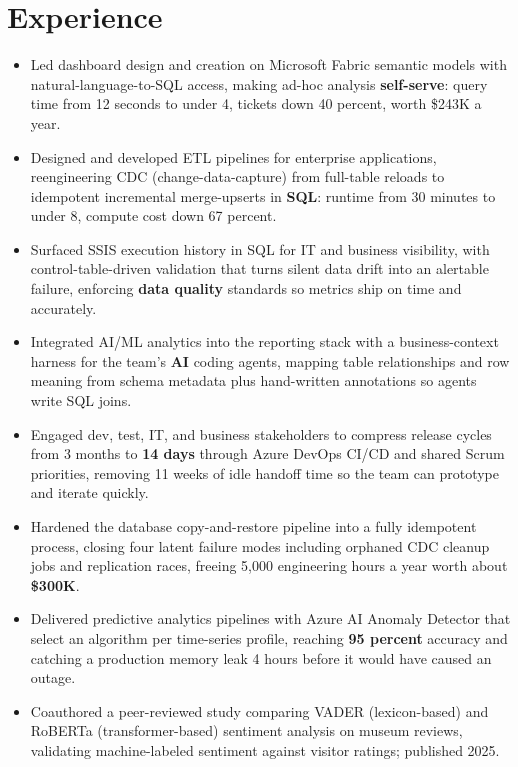 \documentclass[letterpaper,10pt]{article}
\begin{document}
\section{Experience}
\begin{itemize}
\item Led dashboard design and creation on Microsoft Fabric semantic models with natural-language-to-SQL access, making ad-hoc analysis \textbf{self-serve}: query time from 12 seconds to under 4, tickets down 40 percent, worth \$243K a year.
\item Designed and developed ETL pipelines for enterprise applications, reengineering CDC (change-data-capture) from full-table reloads to idempotent incremental merge-upserts in \textbf{SQL}: runtime from 30 minutes to under 8, compute cost down 67 percent.
\item Surfaced SSIS execution history in SQL for IT and business visibility, with control-table-driven validation that turns silent data drift into an alertable failure, enforcing \textbf{data quality} standards so metrics ship on time and accurately.
\item Integrated AI/ML analytics into the reporting stack with a business-context harness for the team's \textbf{AI} coding agents, mapping table relationships and row meaning from schema metadata plus hand-written annotations so agents write SQL joins.
\item Engaged dev, test, IT, and business stakeholders to compress release cycles from 3 months to \textbf{14 days} through Azure DevOps CI/CD and shared Scrum priorities, removing 11 weeks of idle handoff time so the team can prototype and iterate quickly.
\item Hardened the database copy-and-restore pipeline into a fully idempotent process, closing four latent failure modes including orphaned CDC cleanup jobs and replication races, freeing 5,000 engineering hours a year worth about \textbf{\$300K}.
\end{itemize}

\begin{itemize}
\item Delivered predictive analytics pipelines with Azure AI Anomaly Detector that select an algorithm per time-series profile, reaching \textbf{95 percent} accuracy and catching a production memory leak 4 hours before it would have caused an outage.
\item Coauthored a peer-reviewed study comparing VADER (lexicon-based) and RoBERTa (transformer-based) sentiment analysis on museum reviews, validating machine-labeled sentiment against visitor ratings; published 2025.
\end{itemize}
\end{document}
